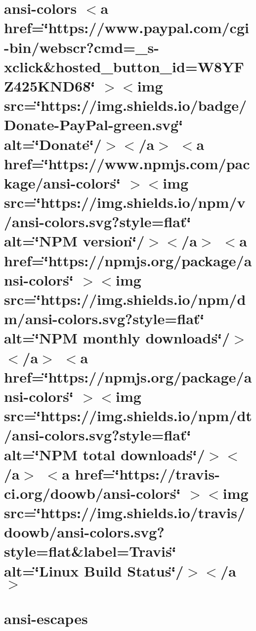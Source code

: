 \documentclass[twoside]{book}
\newcommand{\+}{\discretionary{\mbox{\scriptsize$\hookleftarrow$}}{}{}}
\begin{document}
\chapter{ansi-\/colors \texorpdfstring{$<$}{<}a href=\char`\"{}https\+://www.\+paypal.\+com/cgi-\/bin/webscr?cmd=\+\_\+s-\/xclick\&hosted\+\_\+button\+\_\+id=\+W8\+YFZ425\+KND68\char`\"{} \texorpdfstring{$>$}{>}\texorpdfstring{$<$}{<}img src=\char`\"{}https\+://img.\+shields.\+io/badge/\+Donate-\/\+Pay\+Pal-\/green.\+svg\char`\"{} alt=\char`\"{}\+Donate\char`\"{}/\texorpdfstring{$>$}{>}\texorpdfstring{$<$}{<}/a\texorpdfstring{$>$}{>} \texorpdfstring{$<$}{<}a href=\char`\"{}https\+://www.\+npmjs.\+com/package/ansi-\/colors\char`\"{} \texorpdfstring{$>$}{>}\texorpdfstring{$<$}{<}img src=\char`\"{}https\+://img.\+shields.\+io/npm/v/ansi-\/colors.\+svg?style=flat\char`\"{} alt=\char`\"{}\+NPM version\char`\"{}/\texorpdfstring{$>$}{>}\texorpdfstring{$<$}{<}/a\texorpdfstring{$>$}{>} \texorpdfstring{$<$}{<}a href=\char`\"{}https\+://npmjs.\+org/package/ansi-\/colors\char`\"{} \texorpdfstring{$>$}{>}\texorpdfstring{$<$}{<}img src=\char`\"{}https\+://img.\+shields.\+io/npm/dm/ansi-\/colors.\+svg?style=flat\char`\"{} alt=\char`\"{}\+NPM monthly downloads\char`\"{}/\texorpdfstring{$>$}{>}\texorpdfstring{$<$}{<}/a\texorpdfstring{$>$}{>} \texorpdfstring{$<$}{<}a href=\char`\"{}https\+://npmjs.\+org/package/ansi-\/colors\char`\"{} \texorpdfstring{$>$}{>}\texorpdfstring{$<$}{<}img src=\char`\"{}https\+://img.\+shields.\+io/npm/dt/ansi-\/colors.\+svg?style=flat\char`\"{} alt=\char`\"{}\+NPM total downloads\char`\"{}/\texorpdfstring{$>$}{>}\texorpdfstring{$<$}{<}/a\texorpdfstring{$>$}{>} \texorpdfstring{$<$}{<}a href=\char`\"{}https\+://travis-\/ci.\+org/doowb/ansi-\/colors\char`\"{} \texorpdfstring{$>$}{>}\texorpdfstring{$<$}{<}img src=\char`\"{}https\+://img.\+shields.\+io/travis/doowb/ansi-\/colors.\+svg?style=flat\&label=\+Travis\char`\"{} alt=\char`\"{}\+Linux Build Status\char`\"{}/\texorpdfstring{$>$}{>}\texorpdfstring{$<$}{<}/a\texorpdfstring{$>$}{>}}
\label{md__c___users_vaishnavi_jadhav__desktop__developer_code_mean_stack_example_client_node_modules_ansi_colors__r_e_a_d_m_e}

\chapter{ansi-\/escapes}
\label{md__c___users_vaishnavi_jadhav__desktop__developer_code_mean_stack_example_client_node_modules_ansi_escapes_readme}

\end{document}
